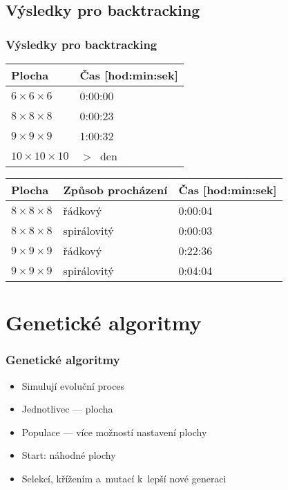 \documentclass{beamer}
\begin{document}
\subsection{Výsledky pro backtracking}

\begin{frame}
\frametitle{Výsledky pro backtracking}
\centering

\begin{block}{}
\centering
\begin{tabular}{|l|l|}
\hline
\textbf{Plocha} & \textbf{Čas [hod:min:sek]} \\
\hline
$6 \times 6 \times 6$ & 0:00:00 \\
$8 \times 8 \times 8$ & 0:00:23 \\
$9 \times 9 \times 9$ & 1:00:32 \\
$10 \times 10 \times 10$ & $>$~den \\
\hline
\end{tabular}
\end{block}

\begin{block}{}
\centering
\begin{tabular}{|l|l|l|}
\hline
\textbf{Plocha} & \textbf{Způsob procházení} & \textbf{Čas [hod:min:sek]} \\
\hline
$8 \times 8 \times 8$ & řádkový & 0:00:04 \\
$8 \times 8 \times 8$ & spirálovitý & 0:00:03 \\
$9 \times 9 \times 9$ & řádkový & 0:22:36 \\
$9 \times 9 \times 9$ & spirálovitý & 0:04:04 \\
\hline
\end{tabular}
\end{block}

\end{frame}


\section{Genetické algoritmy}

\begin{frame}
\frametitle{Genetické algoritmy}

\begin{itemize}
\item Simulují evoluční proces
\item Jednotlivec --- plocha
\item Populace --- více možností nastavení plochy
\item Start: náhodné plochy
\item Selekcí, křížením a~mutací k~lepší nové generaci
\end{itemize}

\end{frame}
\end{document}
